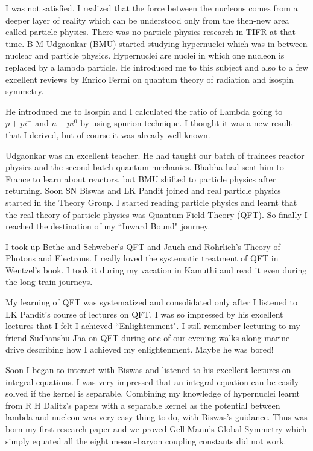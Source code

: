 I was not satisfied. I realized that the force between the nucleons 
comes from a deeper layer of reality which can be understood only from 
the then-new area called particle physics. There was no particle physics 
research in TIFR at that time. B M Udgaonkar (BMU) started studying 
hypernuclei which was in between nuclear and particle physics. 
Hypernuclei are nuclei in which one nucleon is replaced by a lambda 
particle. He introduced me to this subject and also to a few excellent 
reviews by Enrico Fermi on quantum theory of radiation and isospin 
symmetry.
 
He introduced me to Isospin and I calculated the ratio of Lambda going 
to $p + pi^-$ and $n + pi^0$ by using spurion technique. I thought it was a 
new result that I derived, but of course it was already well-known.

Udgaonkar was an excellent teacher. He had taught our ba\-tch of trainees 
reactor physics and the second batch quantum mechanics. Bhabha had sent 
him to France to learn about reactors, but BMU shifted to particle 
physics after returning.
\vskip 1pt
Soon SN Biswas and LK Pandit joined and real particle physics started in 
the Theory Group. I started reading particle physics and learnt that the 
real theory of particle physics was Quantum Field Theory (QFT). So 
finally I reached the destination of my ``Inward Bound" journey.

I took up Bethe and Schweber's QFT and Jauch and Rohrlich's Theory of 
Photons and Electrons. I really loved the systematic treatment of QFT in 
Wentzel's book. I took it during my vacation in Kamuthi and read it even 
during the long train journeys.

My learning of QFT was systematized and consolidated only after I 
listened to LK Pandit's course of lectures on QFT. I was so impressed by 
his excellent lectures that I felt I achieved ``Enlightenment". I still 
remember lecturing to my friend Sudha\-nshu Jha on QFT during one of our 
evening walks along marine drive describing how I achieved my 
enlightenment. Maybe he was bored!
 
Soon I began to interact with Biswas and listened to his exce\-llent 
lectures on integral equations. I was very impressed that an integral 
equation can be easily solved if the kernel is separable. Combining my 
knowledge of hypernuclei learnt from R H Dalitz's papers with a 
separable kernel as the potential between lambda and nucleon was very 
easy thing to do, with Biswas's guidance. Thus was born my first 
research paper and we proved Gell-Mann's Global Symmetry which simply 
equated all the eight meson-baryon coupling constants did not work.

